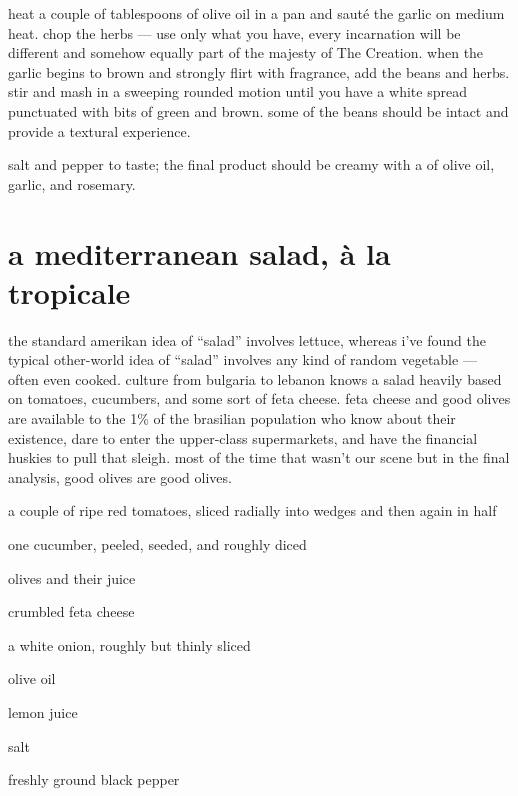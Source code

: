 heat a couple of tablespoons of olive oil in a pan and saut\'{e} the
garlic on medium heat. chop the herbs --- use only what you have,
every incarnation will be different and somehow equally part of the
majesty of The Creation. when the garlic begins to brown and strongly
flirt with fragrance, add the beans and herbs. stir and mash in a
sweeping rounded motion until you have a white spread punctuated with
bits of green and brown. some of the beans should be intact and
provide a textural experience.

salt and pepper to taste; the final product should be creamy with a
 of olive oil, garlic, and rosemary.

\section{a mediterranean salad, \`{a} la tropicale}

the standard amerikan idea of ``salad'' involves lettuce, whereas
i've found the typical other-world idea of ``salad'' involves
any kind of random vegetable --- often even cooked. culture from
bulgaria to lebanon knows a salad heavily based on tomatoes,
cucumbers, and some sort of feta cheese. feta cheese and good olives
are available to the 1\% of the brasilian population who know about
their existence, dare to enter the upper-class supermarkets, and have
the financial huskies to pull that sleigh. most of the time that
wasn't our scene but in the final analysis, good olives are good
olives.

\begin{ingredients}
  \item a couple of ripe red tomatoes, sliced radially into wedges and
  then again in half

  \item one cucumber, peeled, seeded, and roughly diced

  \item olives and their juice

  \item crumbled feta cheese

  \item \onehalf a white onion, roughly but thinly sliced

  \item olive oil

  \item lemon juice

  \item salt

  \item freshly ground black pepper
\end{ingredients}

